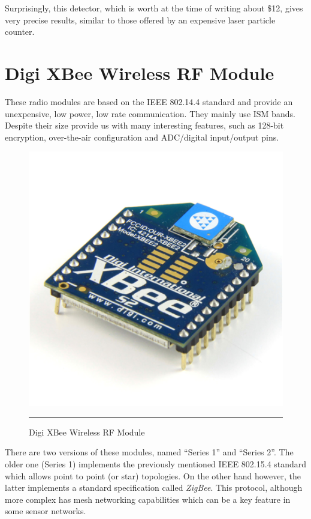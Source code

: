 Surprisingly, this detector, which is worth at the time of writing about \$12, gives very precise results, similar to those offered by an expensive laser particle counter.\citep{airquality}



\section{Digi XBee\textregistered{} Wireless RF Module\citep{xbeedatasheet}}

These radio modules are based on the IEEE 802.14.4 standard and provide an unexpensive, low power, low rate communication. They mainly use ISM bands. Despite their size provide us with many interesting features, such as 128-bit encryption, over-the-air configuration and ADC/digital input/output pins.

\begin{figure}[htbp]
    \centering
    \includegraphics[scale=0.4]{./Figures/xbee.png}
        \rule{35em}{0.5pt}
        \caption[Digi XBee RF Module]{Digi XBee\textregistered{} Wireless RF Module}
    \label{fig:XBee RF Module}
\end{figure}

There are two versions of these modules, named ``Series 1'' and ``Series 2''. The older one (Series 1) implements the previously mentioned IEEE 802.15.4 standard which allows point to point (or star) topologies. On the other hand however, the latter implements a standard specification called \emph{ZigBee}. This protocol, although more complex has mesh networking capabilities which can be a key feature in some sensor networks.

